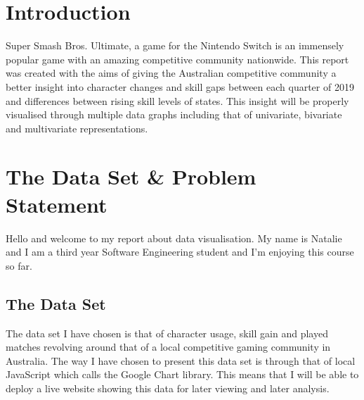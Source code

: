 \documentclass[11pt, oneside, a4paper]{article}
\begin{document}


\pagestyle{fancy}
\fancyhf{}


\newpage
\tableofcontents

\listoffigures

\newpage


\section{Introduction}
Super Smash Bros. Ultimate, a game for the Nintendo Switch is an immensely popular game with an amazing competitive community nationwide. This report was created with the aims of giving the Australian competitive community a better insight into character changes and skill gaps between each quarter of 2019 and differences between rising skill levels of states. This insight will be properly visualised through multiple data graphs including that of univariate, bivariate and multivariate representations.


\section{The Data Set \& Problem Statement}
Hello and welcome to my report about data visualisation. My name is Natalie and I am a third year Software Engineering student and I'm enjoying this course so far.
\
\subsection{The Data Set}
The data set I have chosen is that of character usage, skill gain and played matches revolving around that of a local competitive gaming community in Australia. The way I have chosen to present this data set is through that of local JavaScript which calls the Google Chart library. This means that I will be able to deploy a live website showing this data for later viewing and later analysis. 
\
\end{document}
